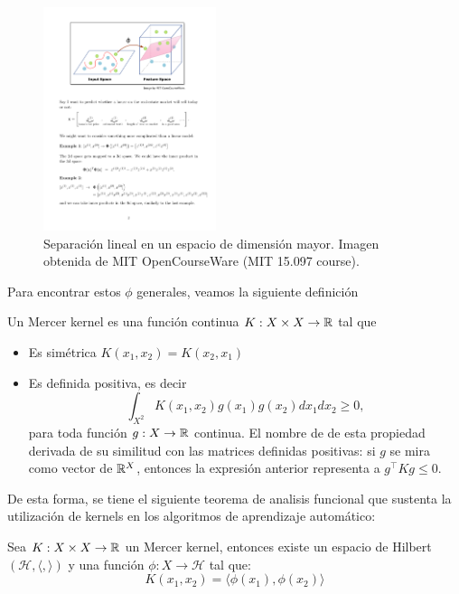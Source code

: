 \begin{figure}[h]
    \centering
    \includegraphics[width=0.45\textwidth]{img/cap5_kernelSVM}
    \caption{Separación lineal en un espacio de dimensión mayor. Imagen obtenida de MIT OpenCourseWare (MIT 15.097 course).}
\end{figure}



\newpage

Para encontrar estos $\phi$ generales, veamos la siguiente definición
\begin{definition}
    Un Mercer kernel es una función continua $K: X\times X \to \mathbb{R}$ tal que
\begin{itemize}
    \item Es simétrica $K(x_1 , x_2 ) = K (x_2 , x_1)$
    \item Es definida positiva, es decir
    $$\int_{X^2} K(x_1, x_2)g(x_1) g(x_2) dx_1 dx_2\geq 0,$$
    para toda función $g:X\rightarrow\mathbb{R}$ continua. El nombre de de esta propiedad derivada de su similitud con las matrices definidas positivas: si $g$ se mira como vector de $\mathbb{R}^X$, entonces la expresión anterior representa a $g^\top Kg\leq 0$.
\end{itemize}

\end{definition}

De esta forma, se tiene el siguiente teorema de analisis funcional que sustenta la utilización de kernels en los algoritmos de aprendizaje automático:


\begin{theorem}
	Sea $K: X\times X \to \mathbb{R}$ un Mercer kernel, entonces existe un espacio de Hilbert $\left(\mathcal{H},\langle,\rangle\right)$ y una función $\phi: X \to \mathcal{H}$ tal que:
	\begin{equation}
    K(x_1, x_2) = \langle \phi(x_1) , \phi(x_2) \rangle
\end{equation}
\end{theorem}

